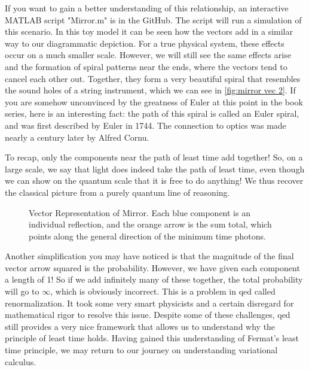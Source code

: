 If you want to gain a better understanding of this relationship, an interactive MATLAB script "Mirror.m" is in the GitHub. The script will run a simulation of this scenario. In this toy model it can be seen how the vectors add in a similar way to our diagrammatic depiction. For a true physical system, these effects occur on a much smaller scale. However, we will still see the same effects arise and the formation of spiral patterns near the ends, where the vectors tend to cancel each other out. Together, they form a very beautiful spiral that resembles the sound holes of a string instrument, which we can see in \autoref{fig:mirror vec 2}. If you are somehow unconvinced by the greatness of Euler at this point in the book series, here is an interesting fact: the path of this spiral is called an Euler spiral, and was first described by Euler in 1744. The connection to optics was made nearly a century later by Alfred Cornu.


To recap, only the components near the path of least time add together! So, on a large scale, we say that light does indeed take the path of least time, even though we can show on the quantum scale that it is free to do anything! We thus recover the classical picture from a purely quantum line of reasoning.

\begin{figure}
    \centering

    \caption{Vector Representation of Mirror. Each blue component is an individual reflection, and the orange arrow is the sum total, which points along the general direction of the minimum time photons.}
    \label{fig:mirror vec 2}
\end{figure}

Another simplification you may have noticed is that the magnitude of the final vector arrow squared is the probability. However, we have given each component a length of 1! So if we add infinitely many of these together, the total probability will go to $\infty$, which is obviously incorrect. This is a problem in \gls{qed} called renormalization. It took some very smart physicists and a certain disregard for mathematical rigor to resolve this issue. Despite some of these challenges, \gls{qed} still provides a very nice framework that allows us to understand why the principle of least time holds. Having gained this understanding of Fermat's least time principle, we may return to our journey on understanding variational calculus.

\newpage
\printendnotes


